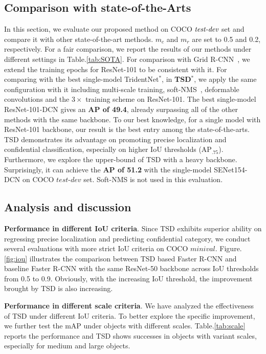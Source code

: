 \documentclass[10pt,twocolumn,letterpaper]{article}
\def \algname{TSD}
\begin{document}
\subsection{Comparison with state-of-the-Arts}
In this section, we evaluate our proposed method on COCO $\emph{test-dev}$ set and compare it with other state-of-the-art methods. $m_c$ and $m_r$ are set to 0.5 and 0.2, respectively.
For a fair comparison, we report the results of our methods under different settings in Table.\ref{tab:SOTA}.
For comparison with Grid R-CNN~\cite{lu2019grid}, we extend the training epochs for ResNet-101 to be consistent with it.
For comparing with the best single-model TridentNet$^*$, in \textbf{\algname{}}$^*$, we apply the same configuration with it including multi-scale training, soft-NMS~\cite{bodla2017soft}, deformable convolutions and the $3\times$ training scheme on ResNet-101.
The best single-model ResNet-101-DCN gives an \textbf{AP of 49.4}, already surpassing all of the other methods with the same backbone. To our best knowledge, for a single model with ResNet-101 backbone, our result is the best entry among the state-of-the-arts.
\algname{} demonstrates its advantage on promoting precise localization and confidential classification, especially on higher IoU thresholds (AP$_{.75}$).
Furthermore, we explore the upper-bound of \algname{} with a heavy backbone.
Surprisingly, it can achieve the \textbf{AP of 51.2} with the single-model SENet154-DCN on COCO $test$-$dev$ set. Soft-NMS is not used in this evaluation.



\subsection{Analysis and discussion}
\textbf{Performance in different IoU criteria}.
Since \algname{} exhibits superior ability on regressing precise localization and predicting confidential category, we conduct several evaluations with more strict IoU criteria on COCO $minival$.
Figure.\ref{fig:iou} illustrates the comparison
between \algname{} based Faster R-CNN and baseline Faster R-CNN with
the same ResNet-50 backbone across IoU thresholds from
0.5 to 0.9.
Obviously, with the increasing IoU threshold, the improvement brought by \algname{} is also increasing.




\textbf{Performance in different scale criteria}.
We have analyzed the effectiveness of \algname{} under different IoU criteria.
To better explore the specific improvement, we further test the mAP under objects with different scales. Table.\ref{tab:scale} reports the performance and \algname{} shows successes in objects with variant scales, especially for medium and large objects.
\end{document}
